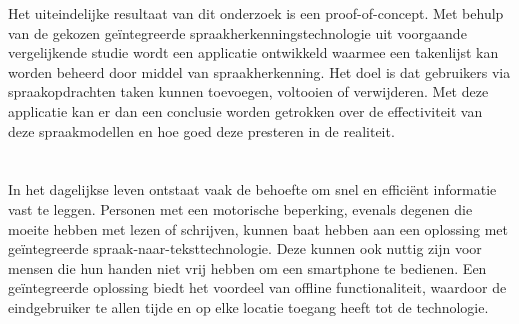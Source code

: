 Het uiteindelijke resultaat van dit onderzoek is een proof-of-concept. Met behulp van de gekozen geïntegreerde spraakherkenningstechnologie uit voorgaande vergelijkende studie wordt een applicatie ontwikkeld waarmee een takenlijst kan worden beheerd door middel van spraakherkenning. Het doel is dat gebruikers via spraakopdrachten taken kunnen toevoegen, voltooien of verwijderen. Met deze applicatie kan er dan een conclusie worden getrokken over de effectiviteit van deze spraakmodellen en hoe goed deze presteren in de realiteit. 


\section{}%
\label{sec:probleemstelling}


In het dagelijkse leven ontstaat vaak de behoefte om snel en efficiënt informatie vast te leggen. Personen met een motorische beperking, evenals degenen die moeite hebben met lezen of schrijven, kunnen baat hebben aan een oplossing met geïntegreerde spraak-naar-teksttechnologie. Deze kunnen ook nuttig zijn voor mensen die hun handen niet vrij hebben om een smartphone te bedienen. Een geïntegreerde oplossing biedt het voordeel van offline functionaliteit, waardoor de eindgebruiker te allen tijde en op elke locatie toegang heeft tot de technologie.


\section{}%
\label{sec:onderzoeksvraag}


